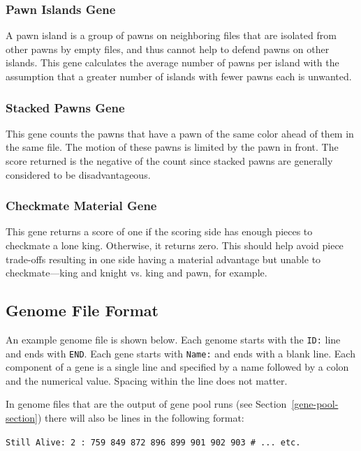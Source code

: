 \documentclass[letterpaper]{article}
\renewcommand{\_}{\allowbreak\textunderscore\allowbreak}
\begin{document}
\subsubsection{Pawn Islands Gene}
A pawn island is a group of pawns on neighboring files that are isolated from other pawns by empty files, and thus cannot help to defend pawns on other islands. This gene calculates the average number of pawns per island with the assumption that a greater number of islands with fewer pawns each is unwanted.

\subsubsection{Stacked Pawns Gene}
This gene counts the pawns that have a pawn of the same color ahead of them in the same file. The motion of these pawns is limited by the pawn in front. The score returned is the negative of the count since stacked pawns are generally considered to be disadvantageous.

\subsubsection{Checkmate Material Gene}
This gene returns a score of one if the scoring side has enough pieces to checkmate a lone king. Otherwise, it returns zero. This should help avoid piece trade-offs resulting in one side having a material advantage but unable to checkmate---king and knight vs\@. king and pawn, for example.


\subsection{Genome File Format}\label{genome-file-format}
An example genome file is shown below. Each genome starts with the \verb|ID:| line and ends with \verb|END|. Each gene starts with \verb|Name:| and ends with a blank line. Each component of a gene is a single line and specified by a name followed by a colon and the numerical value. Spacing within the line does not matter.


In genome files that are the output of gene pool runs (see Section~\ref{gene-pool-section}) there will also be lines in the following format:

\vspace{1ex}
\verb|Still Alive: 2 : 759 849 872 896 899 901 902 903 # ... etc.|
\vspace{1ex}
\end{document}
